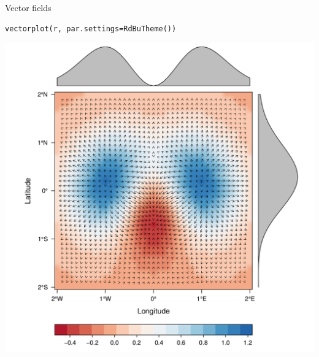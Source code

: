 \documentclass[xcolor={usenames,svgnames,dvipsnames}]{beamer}
\begin{document}
\begin{frame}[fragile,label=sec-18]{Vector fields}
 \lstset{language=R,numbers=none}
\begin{lstlisting}
vectorplot(r, par.settings=RdBuTheme())
\end{lstlisting}

\begin{center}
\includegraphics[height=0.65\textheight]{figs/vectorplot.png}
\end{center}
\end{frame}
\end{document}
